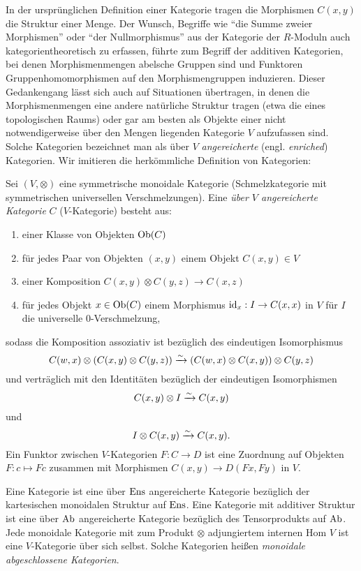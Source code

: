 In der ursprünglichen Definition einer Kategorie tragen die Morphismen
$C(x, y)$ die Struktur einer Menge. Der Wunsch, Begriffe wie ``die
Summe zweier Morphismen'' oder ``der Nullmorphismus'' aus der
Kategorie der $R$-Moduln auch kategorientheoretisch zu erfassen,
führte zum Begriff der additiven Kategorien, bei denen
Morphismenmengen abelsche Gruppen sind und Funktoren
Gruppenhomomorphismen auf den Morphismengruppen induzieren. Dieser
Gedankengang lässt sich auch auf Situationen übertragen, in denen die
Morphismenmengen eine andere natürliche Struktur tragen (etwa die
eines topologischen Raums) oder gar am besten als Objekte einer nicht
notwendigerweise über den Mengen liegenden Kategorie $V$ aufzufassen
sind. Solche Kategorien bezeichnet man als über $V$
\emph{angereicherte} (engl. \emph{enriched}) Kategorien. Wir imitieren
die herkömmliche Definition von Kategorien:
\begin{defn}
  Sei $(V, \otimes)$ eine symmetrische monoidale Kategorie
  (Schmelzkategorie mit symmetrischen universellen
  Verschmelzungen). Eine \emph{über $V$ angereicherte Kategorie} $C$
  ($V$-Kategorie) besteht aus:
  \begin{enumerate}
  \item einer Klasse von Objekten $\operatorname{Ob}(C)$
  \item für jedes Paar von Objekten $(x, y)$ einem Objekt $C(x,y) \in
    V$
  \item einer Komposition $C(x, y) \otimes C(y, z) \to C(x, z)$
  \item für jedes Objekt $x \in \operatorname{Ob}(C)$ einem Morphismus $\operatorname{id}_x: I \to
    C(x, x)$ in $V$ für $I$ die universelle 0-Verschmelzung,
  \end{enumerate}
  sodass die Komposition assoziativ ist bezüglich des eindeutigen
  Isomorphismus
  \[ C(w,x) \otimes (C(x,y) \otimes C(y,z))
  \xrightarrow[]{\sim} (C(w,x) \otimes C(x,y)) \otimes C(y,z)
  \]
  und verträglich mit den Identitäten bezüglich der eindeutigen
  Isomorphismen
  \[ C(x, y) \otimes I \xrightarrow[]{\sim} C(x, y) \]
  und
  \[ I \otimes C(x,y) \xrightarrow[]{\sim} C(x, y). \]
  Ein Funktor zwischen $V$-Kategorien $F: C \to D$ ist eine Zuordnung
  auf Objekten $F: c \mapsto Fc$ zusammen mit Morphismen $C(x, y) \to
  D(Fx, Fy)$ in $V$.
\end{defn}
\begin{bsp}
  Eine Kategorie ist eine über $\operatorname{Ens}$ angereicherte Kategorie
  bezüglich der kartesischen monoidalen Struktur auf $\operatorname{Ens}$. Eine
  Kategorie mit additiver Struktur ist eine über $\operatorname{Ab}$ angereicherte
  Kategorie bezüglich des Tensorprodukts auf $\operatorname{Ab}$. Jede monoidale
  Kategorie mit zum Produkt $\otimes$ adjungiertem internen Hom $V$
  ist eine $V$-Kategorie über sich selbst. Solche Kategorien heißen
  \emph{monoidale abgeschlossene Kategorien}.
\end{bsp}

